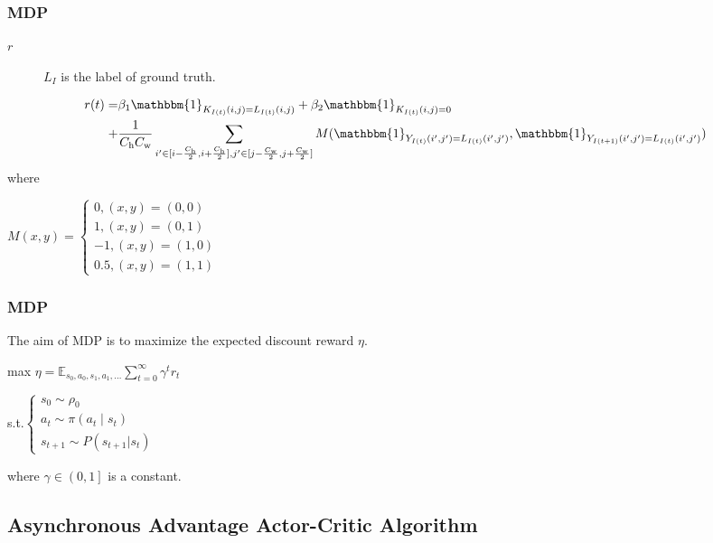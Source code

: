 \documentclass[12pt, aspectratio = 169, xcolor = x11names]{beamer}
\begin{document}
\begin{frame}
  \frametitle{MDP}
  \begin{description}
    \item[$r$]$L_I$ is the label of ground truth.
  \end{description}
  \begin{align*}
    r(t) = & \beta_1\mathbbm{1}_{K_{I(t)}(i, j) = L_{I(t)}(i, j)} +
    \beta_2\mathbbm{1}_{K_{I(t)}(i, j) = 0}\\
    + & \frac{1}{C_\mathrm{h}C_\mathrm{w}} \sum_{%
      i' \in [i - \frac{C_\mathrm{h}}{2}, i + \frac{C_\mathrm{h}}{2}],
      j' \in [j - \frac{C_\mathrm{w}}{2}, j + \frac{C_\mathrm{w}}{2}]
    }M(
    \mathbbm{1}_{Y_{I(t)}(i', j') = L_{I(t)}(i', j')},
    \mathbbm{1}_{Y_{I(t + 1)}(i', j') = L_{I(t)}(i', j')}
    )
  \end{align*}
  where

  \begin{center}
    $M(x, y) =
    \begin{cases}
      0, (x, y) = (0, 0)\\
      1, (x, y) = (0, 1)\\
      -1, (x, y) = (1, 0)\\
      0.5, (x, y) = (1, 1)
    \end{cases}$
  \end{center}
\end{frame}

\begin{frame}
  \frametitle{MDP}
  The aim of MDP is to maximize the expected discount reward $\eta$.

  \begin{center}
    max $\eta = \mathbb{E}_{s_0, a_0, s_1, a_1, \ldots} \sum^\infty_{t = 0} \gamma^t r_t$

    s.t.$
    \begin{cases}
      s_0 \sim \rho_0\\
      a_t \sim \pi(a_t \mid s_t)\\
      s_{t + 1} \sim P(s_{t + 1}|s_t)
    \end{cases}$
  \end{center}

  where $\gamma \in \left(0, 1\right]$ is a constant.
\end{frame}

\subsection{Asynchronous Advantage Actor-Critic Algorithm}%
\label{sub:asynchronous_advantage_actor-critic_algorithm}
\end{document}
